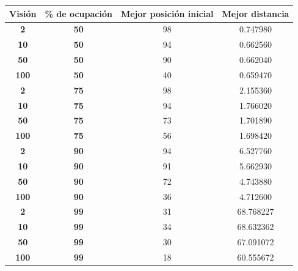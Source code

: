 \documentclass[11pt,a4paper]{report}
\begin{document}
\begin{table}[H]
\centering
\begin{tabular}{c|c|c|c}
\textbf{Visión} & \textbf{\% de ocupación} & \textbf{Mejor posición inicial} & \textbf{Mejor distancia} \\ \hline
\textbf{2}      & \textbf{50}              & 98                              & 0.747980                 \\ \hline
\textbf{10}     & \textbf{50}              & 94                              & 0.662560                 \\ \hline
\textbf{50}     & \textbf{50}              & 90                              & 0.662040                 \\ \hline
\textbf{100}    & \textbf{50}              & 40                              & 0.659470                 \\ \hline
\textbf{2}      & \textbf{75}              & 98                              & 2.155360                 \\ \hline
\textbf{10}     & \textbf{75}              & 94                              & 1.766020                 \\ \hline
\textbf{50}     & \textbf{75}              & 73                              & 1.701890                 \\ \hline
\textbf{100}    & \textbf{75}              & 56                              & 1.698420                 \\ \hline
\textbf{2}      & \textbf{90}              & 94                              & 6.527760                 \\ \hline
\textbf{10}     & \textbf{90}              & 91                              & 5.662930                 \\ \hline
\textbf{50}     & \textbf{90}              & 72                              & 4.743880                 \\ \hline
\textbf{100}    & \textbf{90}              & 36                              & 4.712600                 \\ \hline
\textbf{2}      & \textbf{99}              & 31                              & 68.768227                \\ \hline
\textbf{10}     & \textbf{99}              & 34                              & 68.632362                \\ \hline
\textbf{50}     & \textbf{99}              & 30                              & 67.091072                \\ \hline
\textbf{100}    & \textbf{99}              & 18                              & 60.555672                \\ \hline
\end{tabular}
\end{table}
\end{document}
